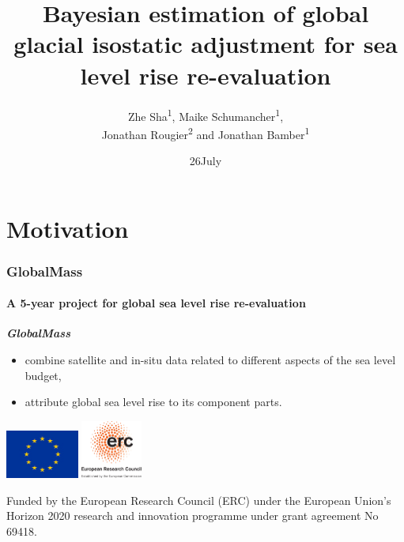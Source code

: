 \documentclass{beamer}
\title[BHM for GIA and global sea level rise]{Bayesian estimation of global glacial isostatic adjustment for sea level rise re-evaluation} %
\author%
[Z. Sha et. al]{Zhe Sha\textsuperscript{1},  Maike Schumancher\textsuperscript{1},  \\ 
 Jonathan Rougier\textsuperscript{2} and Jonathan Bamber\textsuperscript{1}
}
\institute%
{%
    \textsuperscript{1}School of Geographical Sciences,\textsuperscript{2}School of Mathematics\\
    University of Bristol
}
\date{26\space July \space 2017}
\begin{document}
\begin{frame}[plain]
      \titlepage
\end{frame}

\section{Motivation}
\begin{frame}
\frametitle{GlobalMass}
\framesubtitle{A 5-year project for global sea level rise re-evaluation}


\emph{\textbf{GlobalMass}}
\begin{itemize}
\item combine satellite and in-situ data related to different aspects of the sea level budget,
\item attribute global sea level rise to its component parts.
\end{itemize}


\begin{center}
\includegraphics[width = 0.18\textwidth, clip]{images/EUflag}
\hspace{2cm}
\includegraphics[width = 0.15\textwidth, clip]{images/ERClogo}
\end{center}
 
    \footnotesize{Funded by the European Research Council (ERC) under the European Union's Horizon 2020 research and innovation programme under grant agreement No 69418.}




\end{frame}
\end{document}
